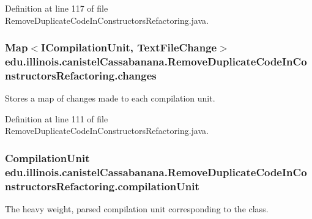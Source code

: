 Definition at line 117 of file RemoveDuplicateCodeInConstructorsRefactoring.java.

\hypertarget{classedu_1_1illinois_1_1canistelCassabanana_1_1RemoveDuplicateCodeInConstructorsRefactoring_af20942a1670a5ccd3debb4b0b10d629c}{
\subsubsection[{changes}]{\setlength{\rightskip}{0pt plus 5cm}Map$<$ICompilationUnit, TextFileChange$>$ {\bf edu.illinois.canistelCassabanana.RemoveDuplicateCodeInConstructorsRefactoring.changes}}}
\label{classedu_1_1illinois_1_1canistelCassabanana_1_1RemoveDuplicateCodeInConstructorsRefactoring_af20942a1670a5ccd3debb4b0b10d629c}
Stores a map of changes made to each compilation unit. 

Definition at line 111 of file RemoveDuplicateCodeInConstructorsRefactoring.java.

\hypertarget{classedu_1_1illinois_1_1canistelCassabanana_1_1RemoveDuplicateCodeInConstructorsRefactoring_aa307d91c3347e0f99dca03fb3789e487}{
\subsubsection[{compilationUnit}]{\setlength{\rightskip}{0pt plus 5cm}CompilationUnit {\bf edu.illinois.canistelCassabanana.RemoveDuplicateCodeInConstructorsRefactoring.compilationUnit}}}
\label{classedu_1_1illinois_1_1canistelCassabanana_1_1RemoveDuplicateCodeInConstructorsRefactoring_aa307d91c3347e0f99dca03fb3789e487}
The heavy weight, parsed compilation unit corresponding to the class. 


